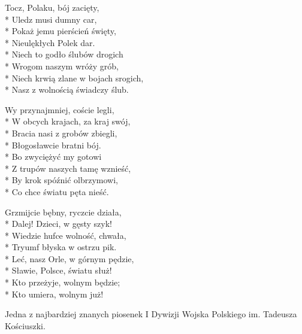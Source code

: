 \begin{lyrics}[longestline={Niech krwią zlane w bojach srogich,}]
\chorusref

Tocz, Polaku, bój zacięty,\\*
Uledz musi dumny car,\\*
Pokaż jemu pierścień święty,\\*
Nieulękłych Polek dar.\\*
Niech to godło ślubów drogich\\*
Wrogom naszym wróży grób,\\*
Niech krwią zlane w bojach srogich,\\*
Nasz z wolnością świadczy ślub.

\chorusref

Wy przynajmniej, coście legli,\\*
W obcych krajach, za kraj swój,\\*
Bracia nasi z grobów zbiegli,\\*
Błogosławcie bratni bój.\\*
Bo zwyciężyć my gotowi\\*
Z trupów naszych tamę wznieść,\\*
By krok spóźnić olbrzymowi,\\*
Co chce światu pęta nieść.

\chorusref

Grzmijcie bębny, ryczcie działa,\\*
Dalej! Dzieci, w gęsty szyk!\\*
Wiedzie hufce wolność, chwała,\\*
Tryumf błyska w ostrzu pik.\\*
Leć, nasz Orle, w górnym pędzie,\\*
Sławie, Polsce, światu służ!\\*
Kto przeżyje, wolnym będzie;\\*
Kto umiera, wolnym już!

\chorusref
\end{lyrics}



\begin{info}Jedna z najbardziej znanych piosenek I Dywizji Wojska Polskiego im. Tadeusza Kościuszki.\end{info}

